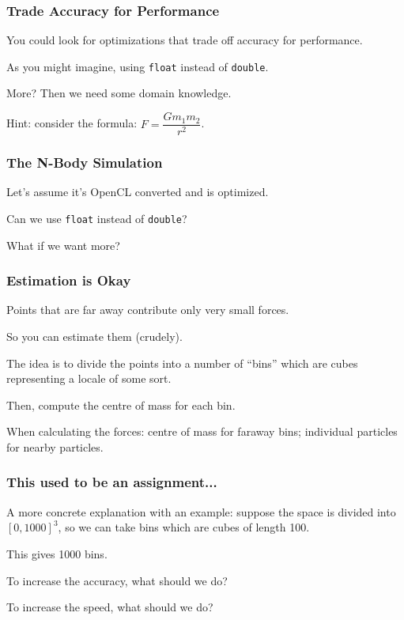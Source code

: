 \begin{frame}
\frametitle{Trade Accuracy for Performance}

You could look for optimizations that trade off accuracy for performance. 

As you might imagine, using \texttt{float} instead of \texttt{double}.


More? Then we need some domain knowledge. 

Hint: consider the formula: $F = \dfrac{Gm_{1}m_{2}}{r^{2}}$. 

\end{frame}



\begin{frame}
\frametitle{The N-Body Simulation}

Let's assume it's OpenCL converted and is optimized.

Can we use \texttt{float} instead of \texttt{double}?

What if we want more?

\end{frame}


\begin{frame}
\frametitle{Estimation is Okay}

Points that are far away contribute only very small forces. 

So you can estimate them (crudely). 

The idea is to divide the points into a number of ``bins'' which are cubes representing a locale of some sort. 

Then, compute the centre of mass for each bin. 

When calculating the forces: centre of mass for faraway bins; individual particles for nearby particles.


\end{frame}


\begin{frame}
\frametitle{This used to be an assignment... }

A more concrete explanation with an example: suppose the space  is divided into $[0, 1000]^3$, so we can take bins which are cubes of length 100. 

This gives 1000 bins. 

To increase the accuracy, what should we do?

To increase the speed, what should we do?

\end{frame}


